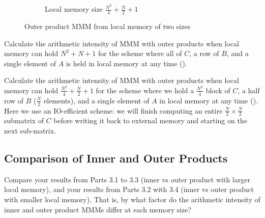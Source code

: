 \documentclass[a4 paper]{article}
\begin{document}
\begin{figure}[H]
\begin{subfigure}{.5\textwidth}
  \caption{Local memory size  $\frac{N^2}{4} + \frac{N}{2} + 1$}
  \label{fig:outermm_n2_4}
\end{subfigure}
\caption{Outer product MMM from local memory of two sizes}
\label{fig:outermm}
\end{figure}


Calculate the arithmetic intensity of MMM with outer products when local memory can hold $N^2+N +1$ for the scheme where all of $C$, a row of $B$, and a single element of $A$ is held in local memory at any time ().


Calculate the arithmetic intensity of MMM with outer products when local memory can hold $\frac{N^2}{4} + \frac{N}{2} + 1$ for the scheme where we hold a $\frac{N^2}{4}$ block of $C$, a half row of $B$ ($\frac{N}{2}$ elements), and a single element of $A$ in local memory at any time ().
Here we use an IO-efficient scheme: we will finish computing an entire $\frac{N}{2} \times \frac{N}{2}$ submatrix of $C$ before writing it back to external memory and starting on the next sub-matrix.



\subsection*{Comparison of Inner and Outer Products}
Compare your results from Parts 3.1 to 3.3 (inner vs outer product with larger local memory), and your results from Parts 3.2 with 3.4 (inner vs outer product with smaller local memory).
That is, by what factor do the arithmetic intensity of inner and outer product MMMs differ at each memory size?
\end{document}
